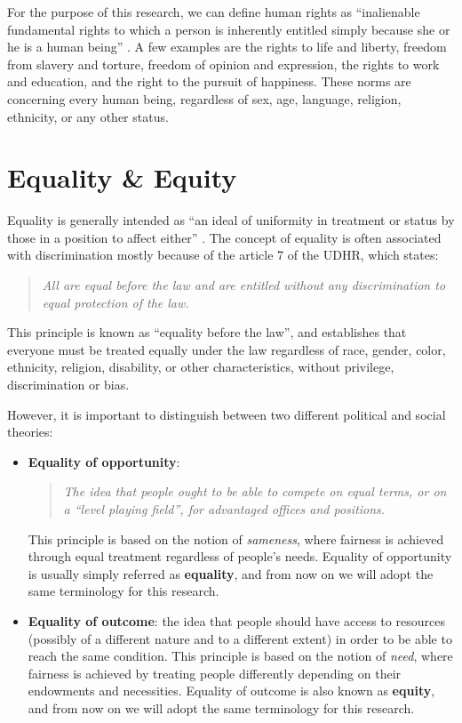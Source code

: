 For the purpose of this research, we can define human rights as ``inalienable fundamental rights to which a person is inherently entitled simply because she or he is a human being'' \cite[p.~3]{sepuldeva2010human}. A few examples are the rights to life and liberty, freedom from slavery and torture, freedom of opinion and expression, the rights to work and education, and the right to the pursuit of happiness. These norms are concerning every human being, regardless of sex, age, language, religion, ethnicity, or any other status.


\section{Equality \& Equity}
Equality is generally intended as ``an ideal of uniformity in treatment or status by those in a position to affect either'' \cite{britannica2009equality}. The concept of equality is often associated with discrimination mostly because of the article 7 of the UDHR, which states:
\begin{quote}\emph{All are equal before the law and are entitled without any discrimination to equal protection of the law.} \cite{assembly1948universal}\end{quote}
This principle is known as ``equality before the law'', and establishes that everyone must be treated equally under the law regardless of race, gender, color, ethnicity, religion, disability, or other characteristics, without privilege, discrimination or bias.

However, it is important to distinguish between two different political and social theories:
\begin{itemize}
\item \textbf{Equality of opportunity}:
\begin{quote}\emph{The idea that people ought to be able to compete on equal terms, or on a ``level playing field'', for advantaged offices and positions.} \cite{britannica2019equal}\end{quote}
This principle is based on the notion of \textit{sameness}, where fairness is achieved through equal treatment regardless of people's needs. Equality of opportunity is usually simply referred as \textbf{equality}, and from now on we will adopt the same terminology for this research.
\item \textbf{Equality of outcome}: the idea that people should have access to resources (possibly of a different nature and to a different extent) in order to be able to reach the same condition. This principle is based on the notion of \textit{need}, where fairness is achieved by treating people differently depending on their endowments and necessities. Equality of outcome is also known as \textbf{equity}, and from now on we will adopt the same terminology for this research.
\end{itemize}

